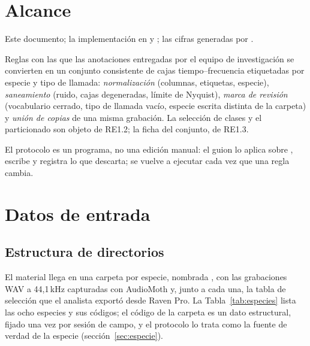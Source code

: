 \documentclass[12pt,a4paper]{article}
\begin{document}

\section{Alcance}

 Este documento; la implementación en
 y
; las cifras generadas por
.

 Reglas con las que las anotaciones entregadas por el equipo de
investigación se convierten en un conjunto consistente de cajas tiempo--frecuencia etiquetadas
por especie y tipo de llamada: \emph{normalización} (columnas, etiquetas, especie),
\emph{saneamiento} (ruido, cajas degeneradas, límite de Nyquist), \emph{marca de revisión}
(vocabulario cerrado, tipo de llamada vacío, especie escrita distinta de la carpeta) y
\emph{unión de copias} de una misma grabación. La selección de clases y el particionado son
objeto de RE1.2; la ficha del conjunto, de RE1.3.

 El protocolo es un programa, no una edición manual: el
guion  lo aplica sobre
, escribe  y registra lo que descarta; se vuelve a
ejecutar cada vez que una regla cambia.


\section{Datos de entrada}

\subsection{Estructura de directorios}

El material llega en una carpeta por especie, nombrada , con
las grabaciones WAV a 44,1\,kHz capturadas con AudioMoth y, junto a cada una, la tabla de
selección que el analista exportó desde Raven Pro. La Tabla~\ref{tab:especies} lista las ocho
especies y sus códigos; el código de la carpeta es un dato estructural, fijado una vez por
sesión de campo, y el protocolo lo trata como la fuente de verdad de la especie
(sección~\ref{sec:especie}).
\end{document}
